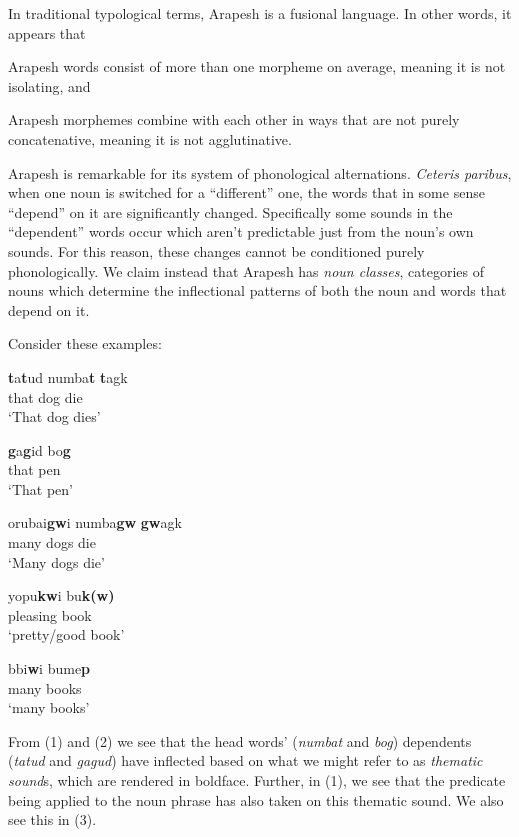 \documentclass[pdftex,12pt,letterpaper]{article}
\let\ipa\textipa
\begin{document}
In traditional typological terms, Arapesh is a fusional language. In other words, it appears that \begin{inparaenum} [(a)] \item Arapesh words consist of more than one morpheme on average, meaning it is not isolating, and \item Arapesh morphemes combine with each other in ways that are not purely concatenative, meaning it is not agglutinative. \end{inparaenum} 

Arapesh is remarkable for its system of phonological alternations. \emph{Ceteris paribus}, when one noun is switched for a ``different'' one, the words that in some sense ``depend'' on it are significantly changed. Specifically some sounds in the ``dependent'' words occur which aren't predictable just from the noun's own sounds. For this reason, these changes cannot be conditioned purely phonologically. We claim instead that Arapesh has \emph{noun classes}, categories of nouns which determine the inflectional patterns of both the noun and words that depend on it.

Consider these examples:

\begin{exe}

\ex
\gll \textbf{t}a\textbf{t}ud numba\textbf{t} \textbf{t}agk \\
that dog die \\
\trans `That dog dies'

\ex
\gll \textbf{g}a\textbf{g}id bo\textbf{g}\\
that pen\\
\trans `That pen'

\ex
\gll orubai\textbf{gw}i numba\textbf{gw} \textbf{gw}agk \\
many dogs die \\
\trans `Many dogs die'

\ex
\gll yopu\textbf{kw}i bu\textbf{k(w)\ipa{\super ?}} \\
pleasing book\\
\trans `pretty/good book'

\ex
\gll b\ipa{@r@h@}bi\textbf{w}i bume\textbf{p} \\
many books\\
\trans `many books'

\end{exe}

\noindent From (1) and (2) we see that the head words' (\emph{numbat} and \emph{bog}) dependents (\emph{tatud} and \emph{gagud}) have inflected based on what we might refer to as \emph{thematic sound}s, which are rendered in boldface. Further, in (1), we see that the predicate being applied to the noun phrase has also taken on this thematic sound. We also see this in (3).
\end{document}
